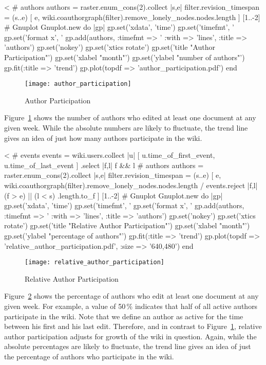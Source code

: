 \documentclass{scrartcl}
\begin{document}
<%
# authors
authors = raster.enum_cons(2).collect { |s,e| 
	filter.revision_timespan = (s..e)
	[ e, wiki.coauthorgraph(filter).remove_lonely_nodes.nodes.length ]
}[1..-2]
# Gnuplot
Gnuplot.new do |gp|
	gp.set('xdata', 'time')
	gp.set('timefmt', '%
	gp.set('format x', '%
	gp.add(authors, :timefmt => '%
		:with => 'lines',
		:title => 'authors')
	gp.set('nokey')
	gp.set('xtics rotate')
	gp.set('title "Author Participation"')
	gp.set('xlabel "month"')
	gp.set('ylabel "number of authors"')
	gp.fit(:title => 'trend')
	gp.plot(topdf => 'author_participation.pdf')
end
\begin{figure}[htbp]
	\centering
	\texttt{[image: author\_participation]}
	\caption{Author Participation}
	\label{fig:author_participation}
\end{figure}

Figure~\ref{fig:author_participation} shows the number of authors who edited at least one document at any given week. While the absolute numbers are likely to fluctuate, the trend line gives an idea of just how many authors participate in the wiki.

<%
# events
events = wiki.users.collect{ |u| 
	[ u.time_of_first_event, u.time_of_last_event ] 
    }.select { |f,l| f && l }
# authors
authors = raster.enum_cons(2).collect { |s,e|
	filter.revision_timespan = (s..e)
	[ e,
    	wiki.coauthorgraph(filter).remove_lonely_nodes.nodes.length /
        events.reject { |f,l| (f > e) || (l < s) }.length.to_f ]
	}[1..-2]
# Gnuplot
Gnuplot.new do |gp|
	gp.set('xdata', 'time')
	gp.set('timefmt', '%
	gp.set('format x', '%
	gp.add(authors, :timefmt => '%
		:with => 'lines',
		:title => 'authors')
	gp.set('nokey')
	gp.set('xtics rotate')
	gp.set('title "Relative Author Participation"')
	gp.set('xlabel "month"')
	gp.set('ylabel "percentage of authors"')
	gp.fit(:title => 'trend')
	gp.plot(topdf => 'relative_author_participation.pdf', :size => '640,480')
end

\begin{figure}[htbp]
	\centering
	\texttt{[image: relative\_author\_participation]}
	\caption{Relative Author Participation}
	\label{fig:relative_author_participation}
\end{figure}

Figure~\ref{fig:relative_author_participation} shows the percentage of authors who edit at least one document at any given week. For example, a value of 50\,\% indicates that half of all active authors participate in the wiki. Note that we define an author as active for the time between his first and his last edit. Therefore, and in contrast to Figure~\ref{fig:author_participation}, relative author participation adjusts for growth of the wiki in question. Again, while the absolute percentages are likely to fluctuate, the trend line gives an idea of just the percentage of authors who participate in the wiki.
\end{document}
